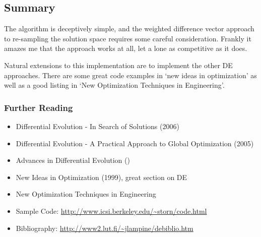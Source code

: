 \subsection{Summary}
The algorithm is deceptively simple, and the weighted difference vector approach to re-sampling the solution space requires some careful consideration. Frankly it amazes me that the approach works at all, let a lone as competitive as it does.

Natural extensions to this implementation are to implement the other DE approaches. There are some great code examples in `new ideas in optimization' as well as a good listing in `New Optimization Techniques in Engineering'.

\subsubsection{Further Reading}

\begin{itemize}
	\item Differential Evolution - In Search of Solutions (2006)
	\item Differential Evolution - A Practical Approach to Global Optimization (2005)
	\item Advances in Differential Evolution ()
	\item New Ideas in Optimization (1999), great section on DE
	\item New Optimization Techniques in Engineering
	\item Sample Code: \url{http://www.icsi.berkeley.edu/~storn/code.html}
	\item Bibliography: \url{http://www2.lut.fi/~jlampine/debiblio.htm}
\end{itemize}